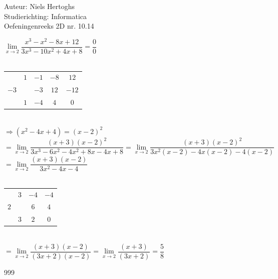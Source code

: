 \documentclass[a4paper]{article}
\begin{document}
  
\noindent \large Auteur: Niels Hertoghs \\
\noindent \large Studierichting: Informatica\\
\noindent \large Oefeningenreeks 2D nr. 10.14\\

\medskip

\normalsize

$\lim\limits_{x \rightarrow 2}  \dfrac{x^3-x^2-8x+12}{3x^3-10x^2+4x+8} = \dfrac{0}{0} $\\\\


\begin{tabular}{c|ccc|c}
			& $1$	& $-1$ 	& $-8$ 	& 			$12$ \\
	   $-3$ & 		& $-3$ 	& $12$ 	& 			$-12$ \\ \hline
			& $1$ 	& $-4$ 	& $4$ 	& 	$0$  \\

\end{tabular}\\

$\Rightarrow (x^2-4x+4) = (x-2)^2$\\

$=\lim\limits_{x \rightarrow 2}  \dfrac{(x+3)(x-2)^2}{3x^3-6x^2-4x^2+8x-4x+8} = \lim\limits_{x \rightarrow 2}  \dfrac{(x+3)(x-2)^2}{3x^2(x-2)-4x(x-2)-4(x-2)}$\\

$=\lim\limits_{x \rightarrow 2}  \dfrac{(x+3)(x-2)}{3x^2-4x-4}$\\\\

\begin{tabular}{c|cc|c}
	 & $3$	& $-4$ 	&		$-4$\\
$2$ & 		& $6$ 	& 		$4$ \\ \hline
 	 & $3$ 	& $2$ 	& $0$ \\
	
\end{tabular}\\

$=\lim\limits_{x \rightarrow 2}  \dfrac{(x+3)(x-2)}{(3x+2)(x-2)} = \lim\limits_{x \rightarrow 2}\dfrac{(x+3)}{(3x+2)} = \dfrac{5}{8}$\\


\begin{thebibliography}{999}
\end{thebibliography}
\end{document}
